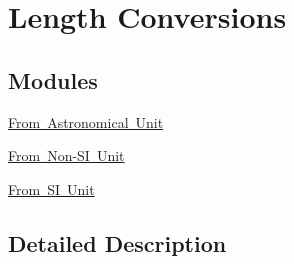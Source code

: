 \hypertarget{group___e_g_x_math-_conversions-_length_conversions}{}\section{Length Conversions}
\label{group___e_g_x_math-_conversions-_length_conversions}
\subsection*{Modules}
\begin{DoxyCompactItemize}
\item 
\mbox{\hyperlink{group___e_g_x_math-_conversions-_length_conversions-_astronomical}{From Astronomical Unit}}
\item 
\mbox{\hyperlink{group___e_g_x_math-_conversions-_length_conversions-_non-_s_i}{From Non-\/\+S\+I Unit}}
\item 
\mbox{\hyperlink{group___e_g_x_math-_conversions-_length_conversions-_s_i}{From S\+I Unit}}
\end{DoxyCompactItemize}


\subsection{Detailed Description}
